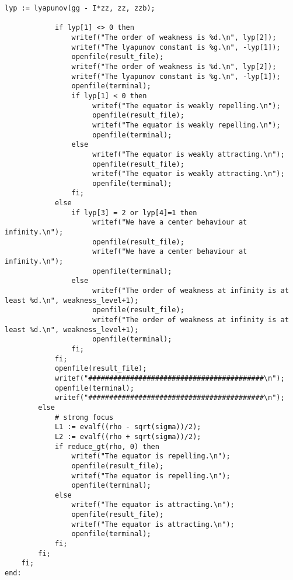 \documentclass[a4paper,10pt]{article}
\begin{document}
\begin{lstlisting}[name=infinity]
            lyp := lyapunov(gg - I*zz, zz, zzb);

            if lyp[1] <> 0 then
                writef("The order of weakness is %d.\n", lyp[2]);
                writef("The lyapunov constant is %g.\n", -lyp[1]);
                openfile(result_file);
                writef("The order of weakness is %d.\n", lyp[2]);
                writef("The lyapunov constant is %g.\n", -lyp[1]);
                openfile(terminal);
                if lyp[1] < 0 then
                     writef("The equator is weakly repelling.\n");
                     openfile(result_file);
                     writef("The equator is weakly repelling.\n");
                     openfile(terminal);
                else
                     writef("The equator is weakly attracting.\n");
                     openfile(result_file);
                     writef("The equator is weakly attracting.\n");
                     openfile(terminal);
                fi;
            else
                if lyp[3] = 2 or lyp[4]=1 then
                     writef("We have a center behaviour at infinity.\n");
                     openfile(result_file);
                     writef("We have a center behaviour at infinity.\n");
                     openfile(terminal);
                else
                     writef("The order of weakness at infinity is at least %d.\n", weakness_level+1);
                     openfile(result_file);
                     writef("The order of weakness at infinity is at least %d.\n", weakness_level+1);
                     openfile(terminal);
                fi;
            fi;
            openfile(result_file);
            writef("##########################################\n");
            openfile(terminal);
            writef("##########################################\n");
        else
            # strong focus
            L1 := evalf((rho - sqrt(sigma))/2);
            L2 := evalf((rho + sqrt(sigma))/2);
            if reduce_gt(rho, 0) then
                writef("The equator is repelling.\n");
                openfile(result_file);
                writef("The equator is repelling.\n");
                openfile(terminal);
            else
                writef("The equator is attracting.\n");
                openfile(result_file);
                writef("The equator is attracting.\n");
                openfile(terminal);
            fi;
        fi;
    fi;
end:
\end{lstlisting}
\end{document}

